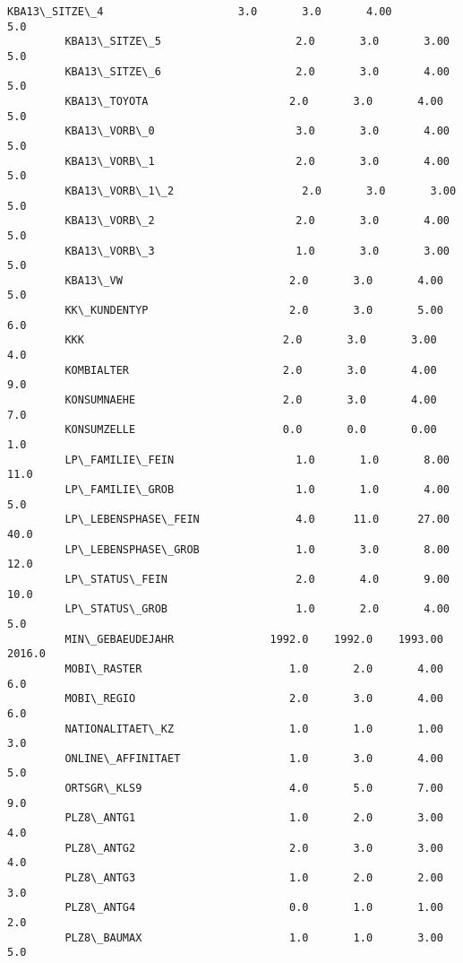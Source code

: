 \documentclass[11pt]{article}
\begin{document}
\begin{Verbatim}[commandchars=\\\{\}]
         KBA13\_SITZE\_4                     3.0       3.0       4.00        5.0  
         KBA13\_SITZE\_5                     2.0       3.0       3.00        5.0  
         KBA13\_SITZE\_6                     2.0       3.0       4.00        5.0  
         KBA13\_TOYOTA                      2.0       3.0       4.00        5.0  
         KBA13\_VORB\_0                      3.0       3.0       4.00        5.0  
         KBA13\_VORB\_1                      2.0       3.0       4.00        5.0  
         KBA13\_VORB\_1\_2                    2.0       3.0       3.00        5.0  
         KBA13\_VORB\_2                      2.0       3.0       4.00        5.0  
         KBA13\_VORB\_3                      1.0       3.0       3.00        5.0  
         KBA13\_VW                          2.0       3.0       4.00        5.0  
         KK\_KUNDENTYP                      2.0       3.0       5.00        6.0  
         KKK                               2.0       3.0       3.00        4.0  
         KOMBIALTER                        2.0       3.0       4.00        9.0  
         KONSUMNAEHE                       2.0       3.0       4.00        7.0  
         KONSUMZELLE                       0.0       0.0       0.00        1.0  
         LP\_FAMILIE\_FEIN                   1.0       1.0       8.00       11.0  
         LP\_FAMILIE\_GROB                   1.0       1.0       4.00        5.0  
         LP\_LEBENSPHASE\_FEIN               4.0      11.0      27.00       40.0  
         LP\_LEBENSPHASE\_GROB               1.0       3.0       8.00       12.0  
         LP\_STATUS\_FEIN                    2.0       4.0       9.00       10.0  
         LP\_STATUS\_GROB                    1.0       2.0       4.00        5.0  
         MIN\_GEBAEUDEJAHR               1992.0    1992.0    1993.00     2016.0  
         MOBI\_RASTER                       1.0       2.0       4.00        6.0  
         MOBI\_REGIO                        2.0       3.0       4.00        6.0  
         NATIONALITAET\_KZ                  1.0       1.0       1.00        3.0  
         ONLINE\_AFFINITAET                 1.0       3.0       4.00        5.0  
         ORTSGR\_KLS9                       4.0       5.0       7.00        9.0  
         PLZ8\_ANTG1                        1.0       2.0       3.00        4.0  
         PLZ8\_ANTG2                        2.0       3.0       3.00        4.0  
         PLZ8\_ANTG3                        1.0       2.0       2.00        3.0  
         PLZ8\_ANTG4                        0.0       1.0       1.00        2.0  
         PLZ8\_BAUMAX                       1.0       1.0       3.00        5.0  

\end{Verbatim}
\end{document}
